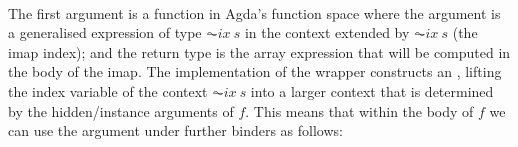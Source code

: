 \begin{code}%
%
\>[2]\AgdaSpace{}%
\AgdaSymbol{:}\AgdaSpace{}%
\AgdaSymbol{(}\AgdaSpace{}%
\AgdaSymbol{(}\AgdaSpace{}%
\AgdaSpace{}%
\AgdaSpace{}%
\AgdaSymbol{)}\AgdaSpace{}%
\AgdaSymbol{(}\AgdaSpace{}%
\AgdaSymbol{)}\AgdaSpace{}%
\AgdaSpace{}%
\AgdaSpace{}%
\AgdaSymbol{(}\AgdaSpace{}%
\AgdaSpace{}%
\AgdaSpace{}%
\AgdaSymbol{)}\AgdaSpace{}%
\AgdaSymbol{(}\AgdaSpace{}%
\AgdaSymbol{))}\AgdaSpace{}%
\AgdaSpace{}%
\AgdaSpace{}%
\AgdaSpace{}%
\AgdaSymbol{(}\AgdaSpace{}%
\AgdaSymbol{(}\AgdaSpace{}%
\AgdaSpace{}%
\AgdaSymbol{))}\<%
\\
%
\>[2]\AgdaSpace{}%
\AgdaSpace{}%
\AgdaSymbol{=}\AgdaSpace{}%
\AgdaSpace{}%
\AgdaSymbol{(}\AgdaSpace{}%
\AgdaSymbol{(}\AgdaSpace{}%
\AgdaSpace{}%
\AgdaSpace{}%
\AgdaSymbol{))}\<%
\end{code}
The first argument is a function in Agda's function space where the
argument is a generalised expression of type $\AC{ix}\ s$ in the context
extended by $\AC{ix}\ s$ (the imap index); and the return type is the array
expression that will be computed in the body of the imap.  The implementation
of the wrapper constructs an , lifting the index variable
 of the context   $\AC{ix}\ s$ into a larger context that is determined
by the hidden/instance arguments of $f$.  This means that within the body of $f$
we can use the argument under further binders as follows:
\begin{code}%
%
\>[2]\AgdaFunction{\AgdaUnderscore{}}\AgdaSpace{}%
\AgdaSymbol{:}\AgdaSpace{}%
\AgdaSpace{}%
\AgdaSpace{}%
\AgdaSymbol{\AgdaUnderscore{}}\<%
\\
%
\>[2]\AgdaSymbol{\AgdaUnderscore{}}\AgdaSpace{}%
\AgdaSymbol{=}\AgdaSpace{}%
\AgdaSpace{}%
\AgdaSymbol{\{}\AgdaSpace{}%
\AgdaSymbol{=}\AgdaSpace{}%
\AgdaSpace{}%
\AgdaSymbol{\}}\AgdaSpace{}%
\AgdaSpace{}%
\AgdaSpace{}%
\AgdaSpace{}%
\AgdaSpace{}%
\AgdaSymbol{\{}\AgdaSpace{}%
\AgdaSymbol{=}\AgdaSpace{}%
\AgdaSpace{}%
\AgdaSymbol{\}}\AgdaSpace{}%
\AgdaSpace{}%
\AgdaSpace{}%
\AgdaSpace{}%
\AgdaSpace{}%
\AgdaSymbol{(}\AgdaSpace{}%
\AgdaSpace{}%
\AgdaSymbol{)}\AgdaSpace{}%
\<%
\end{code}
